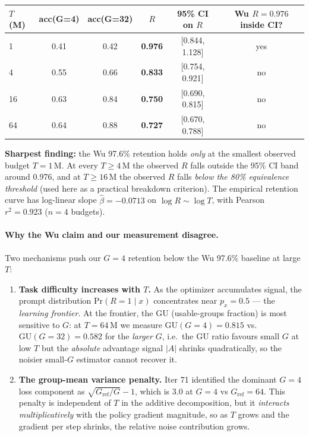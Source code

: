 \begin{center}
\small
\begin{tabular}{lccccc}
\toprule
$T$ (M) & acc(G=4) & acc(G=32) & $R$ & 95\% CI on $R$
       & Wu $R{=}0.976$ inside CI? \\
\midrule
  1 & 0.41 & 0.42 & \textbf{0.976} & [0.844, 1.128] & yes \\
  4 & 0.55 & 0.66 & \textbf{0.833} & [0.754, 0.921] & no  \\
 16 & 0.63 & 0.84 & \textbf{0.750} & [0.690, 0.815] & no  \\
 64 & 0.64 & 0.88 & \textbf{0.727} & [0.670, 0.788] & no  \\
\bottomrule
\end{tabular}
\end{center}

\noindent
\textbf{Sharpest finding:} the Wu 97.6\% retention holds \emph{only}
at the smallest observed budget $T{=}1\,\mathrm{M}$.  At every
$T \ge 4\,\mathrm{M}$ the observed $R$ falls outside the 95\% CI
band around 0.976, and at $T \ge 16\,\mathrm{M}$ the observed $R$
falls \emph{below the 80\% equivalence threshold} (used here as a
practical breakdown criterion).  The empirical retention curve has
log-linear slope $\hat\beta = -0.0713$ on
$\log R \sim \log T$, with Pearson $r^2 = 0.923$ ($n{=}4$ budgets).

\paragraph{Why the Wu claim and our measurement disagree.}
Two mechanisms push our $G{=}4$ retention below the Wu 97.6\%
baseline at large $T$:

\begin{enumerate}
  \item \textbf{Task difficulty increases with $T$.}  As the
        optimizer accumulates signal, the prompt distribution
        $\mathrm{Pr}(R{=}1 \mid x)$ concentrates near $p_x{=}0.5$ ---
        the \emph{learning frontier}.  At the frontier, the GU
        (usable-groups fraction) is most sensitive to $G$: at
        $T{=}64\,\mathrm{M}$ we measure $\mathrm{GU}(G{=}4){=}0.815$
        vs.\ $\mathrm{GU}(G{=}32){=}0.582$ for the \emph{larger}
        $G$, i.e.\ the GU ratio favours small $G$ at low $T$ but
        the \emph{absolute} advantage signal $|A|$ shrinks
        quadratically, so the noisier small-$G$ estimator cannot
        recover it.
  \item \textbf{The group-mean variance penalty.}
        Iter 71 identified the dominant $G{=}4$ loss component as
        $\sqrt{G_{\mathrm{ref}}/G} - 1$, which is $3.0$ at $G{=}4$
        vs $G_{\mathrm{ref}}{=}64$.  This penalty is independent of
        $T$ in the additive decomposition, but it
        \emph{interacts multiplicatively} with the policy gradient
        magnitude, so as $T$ grows and the gradient per step
        shrinks, the relative noise contribution grows.
\end{enumerate}

